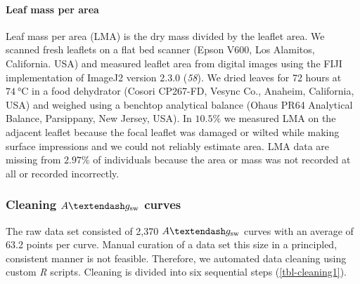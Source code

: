 \documentclass[
  letterpaper,
  DIV=11,
  numbers=noendperiod]{scrartcl}
\let\oldparagraph\paragraph
\renewcommand{\paragraph}[1]{\oldparagraph{#1}\mbox{}}
\newcommand{\agcurve}{$A \textendash g_\text{sw}$}
\begin{document}
\paragraph{Leaf mass per area}\label{leaf-mass-per-area}

Leaf mass per area (LMA) is the dry mass divided by the leaflet area. We
scanned fresh leaflets on a flat bed scanner (Epson V600, Los Alamitos,
California. USA) and measured leaflet area from digital images using the
FIJI implementation of ImageJ2 version 2.3.0 (\emph{58}). We dried
leaves for 72 hours at \(\qty{74}{\degreeCelsius}\) in a food dehydrator
(Cosori CP267-FD, Vesync Co., Anaheim, California, USA) and weighed
using a benchtop analytical balance (Ohaus PR64 Analytical Balance,
Parsippany, New Jersey, USA). In \(10.5\%\) we measured LMA on the
adjacent leaflet because the focal leaflet was damaged or wilted while
making surface impressions and we could not reliably estimate area. LMA
data are missing from \(2.97\%\) of individuals because the area or mass
was not recorded at all or recorded incorrectly.

\subsubsection{\texorpdfstring{Cleaning \agcurve{}
curves}{Cleaning  curves}}\label{cleaning-curves}

The raw data set consisted of 2,370 \agcurve{} curves with an average of
63.2 points per curve. Manual curation of a data set this size in a
principled, consistent manner is not feasible. Therefore, we automated
data cleaning using custom \emph{R} scripts. Cleaning is divided into
six sequential steps (\autoref{tbl-cleaning1}).
\end{document}
